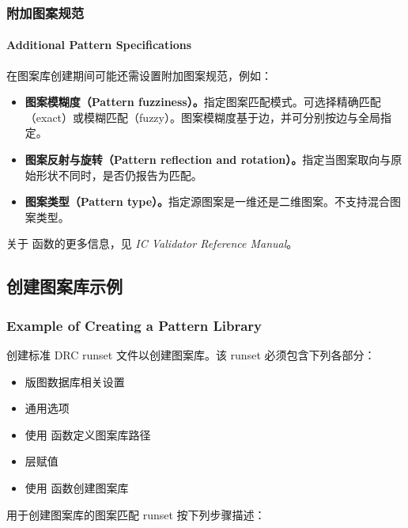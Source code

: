 
\subsubsection{附加图案规范}
\paragraph*{Additional Pattern Specifications}

在图案库创建期间可能还需设置附加图案规范，例如：
\begin{itemize}
  \item \textbf{图案模糊度（Pattern fuzziness）。}指定图案匹配模式。可选择精确匹配（exact）或模糊匹配（fuzzy）。图案模糊度基于边，并可分别按边与全局指定。
  \item \textbf{图案反射与旋转（Pattern reflection and rotation）。}指定当图案取向与原始形状不同时，是否仍报告为匹配。
  \item \textbf{图案类型（Pattern type）。}指定源图案是一维还是二维图案。不支持混合图案类型。
\end{itemize}

\begin{seeAlsoBox}
关于  函数的更多信息，见 \textit{IC Validator Reference Manual}。
\end{seeAlsoBox}

\subsection{创建图案库示例}
\subsubsection*{Example of Creating a Pattern Library}

创建标准 DRC runset 文件以创建图案库。该 runset 必须包含下列各部分：
\begin{itemize}
  \item 版图数据库相关设置
  \item 通用选项
  \item 使用  函数定义图案库路径
  \item 层赋值
  \item 使用  函数创建图案库
\end{itemize}

用于创建图案库的图案匹配 runset 按下列步骤描述：

